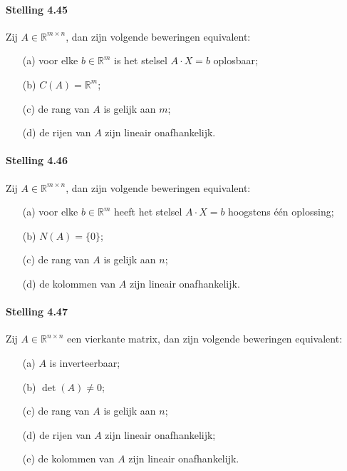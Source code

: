 \documentclass[11pt,oneside,a4paper]{article}
\begin{document}
	\paragraph{Stelling 4.45}
		Zij $A \in \mathbb{R}^{m\times n}$, dan zijn volgende beweringen equivalent:
		\begin{itemize}
			\item[(a)] voor elke $b \in \mathbb{R}^m$ is het stelsel $A \cdot X = b$ oplosbaar;
			\item[(b)] $C(A) = \mathbb{R}^m$;
			\item[(c)] de rang van $A$ is gelijk aan $m$;
			\item[(d)] de rijen van $A$ zijn lineair onafhankelijk.
		\end{itemize}
	\paragraph{Stelling 4.46}
		Zij $A \in \mathbb{R}^{m\times n}$, dan zijn volgende beweringen equivalent:
		\begin{itemize}
			\item[(a)] voor elke $b \in \mathbb{R}^m$ heeft het stelsel $A \cdot X = b$ hoogstens één oplossing;
			\item[(b)] $N(A) = \{0\}$;
			\item[(c)] de rang van $A$ is gelijk aan $n$;
			\item[(d)] de kolommen van $A$ zijn lineair onafhankelijk.
		\end{itemize}
	\paragraph{Stelling 4.47}
		Zij $A \in \mathbb{R}^{n\times n}$ een vierkante matrix, dan zijn volgende beweringen equivalent:
		\begin{itemize}
			\item[(a)] $A$ is inverteerbaar;
			\item[(b)] $\det(A) \ne 0$;
			\item[(c)] de rang van $A$ is gelijk aan $n$;
			\item[(d)] de rijen van $A$ zijn lineair onafhankelijk;
			\item[(e)] de kolommen van $A$ zijn lineair onafhankelijk.
		\end{itemize}
\end{document}
